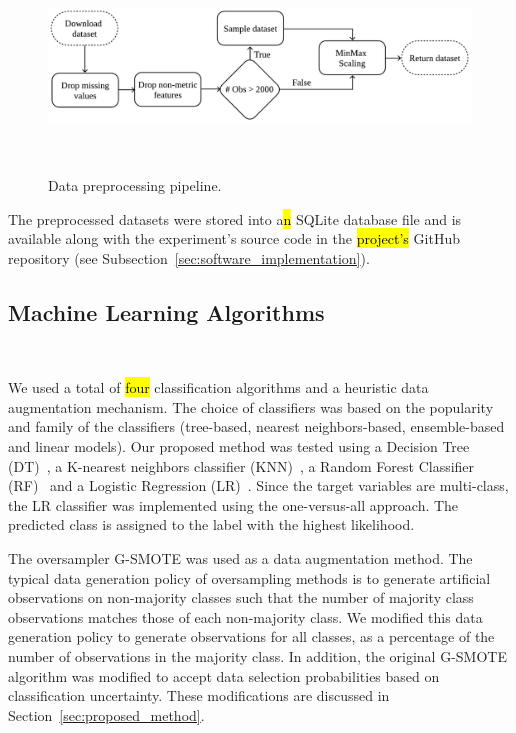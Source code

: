 \documentclass[preprint, 12pt]{elsarticle}
\begin{document}
\begin{figure}[H]
	\centering
	\includegraphics[width=1\linewidth]{../analysis/data_preprocessing}
    \caption{%
        Data preprocessing pipeline.
    }~\label{fig:data_preprocessing}
\end{figure}

The preprocessed datasets were stored into a\hl{n} SQLite database file and is
available along with the experiment's source code in the \hl{project's }GitHub
repository (see Subsection~\ref{sec:software_implementation}).
 
\subsection{Machine Learning Algorithms}~\label{sec:machine_learning_algorithms}

We used a total of \hl{four} classification algorithms and a heuristic data
augmentation mechanism. The choice of classifiers was based on the popularity
and family of the classifiers (tree-based, nearest neighbors-based,
ensemble-based and linear models). Our proposed method was tested using a
Decision Tree (DT)~\cite{Wu1975}, a K-nearest neighbors classifier
(KNN)~\cite{Cover1967}, a Random Forest Classifier (RF)~\cite{Ho1995} and a
Logistic Regression (LR)~\cite{Nelder1972}. Since the target variables are
multi-class, the LR classifier was implemented using the one-versus-all
approach. The predicted class is assigned to the label with the highest
likelihood.
 
The oversampler G-SMOTE was used as a data augmentation method. The typical
data generation policy of oversampling methods is to generate artificial
observations on non-majority classes such that the number of majority class
observations matches those of each non-majority class. We modified this data
generation policy to generate observations for all classes, as a percentage of
the number of observations in the majority class. In addition, the original
G-SMOTE algorithm was modified to accept data selection probabilities based on
classification uncertainty. These modifications are discussed in
Section~\ref{sec:proposed_method}.
\end{document}
